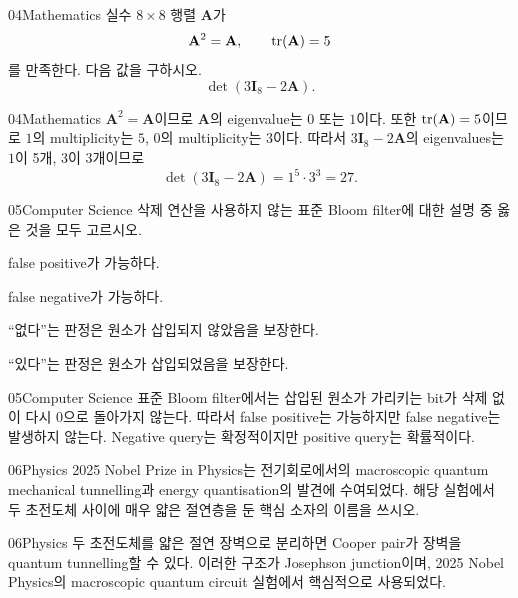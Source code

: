 \documentclass[12pt,aspectratio=169]{beamer}
\begin{document}
\begin{problemframe}{04}{Mathematics}
실수 $8\times8$ 행렬 $\mathbf A$가
\[
\mathbf A^2=\mathbf A,
\qquad
\operatorname{tr}(\mathbf A)=5
\]
를 만족한다. 다음 값을 구하시오.
\[
\det(3\mathbf I_8-2\mathbf A).
\]
\end{problemframe}

\begin{solutionframe}{04}{Mathematics}
$\mathbf A^2=\mathbf A$이므로 $\mathbf A$의 eigenvalue는 $0$ 또는 $1$이다. 또한 $\operatorname{tr}(\mathbf A)=5$이므로 $1$의 multiplicity는 $5$, $0$의 multiplicity는 $3$이다. 따라서 $3\mathbf I_8-2\mathbf A$의 eigenvalues는 $1$이 5개, $3$이 3개이므로
\[
\det(3\mathbf I_8-2\mathbf A)=1^5\cdot3^3=27.
\]
\end{solutionframe}

\begin{problemframe}{05}{Computer Science}
삭제 연산을 사용하지 않는 표준 Bloom filter에 대한 설명 중 옳은 것을 모두 고르시오.
\begin{simchoices}
\item false positive가 가능하다.
\item false negative가 가능하다.
\item ``없다''는 판정은 원소가 삽입되지 않았음을 보장한다.
\item ``있다''는 판정은 원소가 삽입되었음을 보장한다.
\end{simchoices}
\end{problemframe}

\begin{solutionframe}{05}{Computer Science}
표준 Bloom filter에서는 삽입된 원소가 가리키는 bit가 삭제 없이 다시 $0$으로 돌아가지 않는다. 따라서 false positive는 가능하지만 false negative는 발생하지 않는다. Negative query는 확정적이지만 positive query는 확률적이다.
\end{solutionframe}

\begin{problemframe}{06}{Physics}
2025 Nobel Prize in Physics는 전기회로에서의 macroscopic quantum mechanical tunnelling과 energy quantisation의 발견에 수여되었다. 해당 실험에서 두 초전도체 사이에 매우 얇은 절연층을 둔 핵심 소자의 이름을 쓰시오.
\end{problemframe}

\begin{solutionframe}{06}{Physics}
두 초전도체를 얇은 절연 장벽으로 분리하면 Cooper pair가 장벽을 quantum tunnelling할 수 있다. 이러한 구조가 Josephson junction이며, 2025 Nobel Physics의 macroscopic quantum circuit 실험에서 핵심적으로 사용되었다.
\end{solutionframe}
\end{document}
